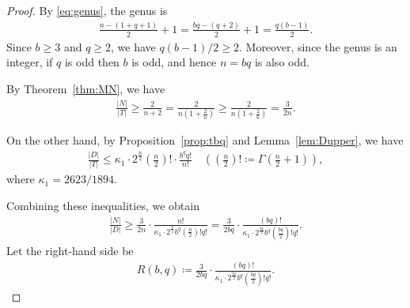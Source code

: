 \documentclass[12pt,reqno]{amsart}
\newcommand{\HL}{\vspace{2mm}}							%
\newcommand{\q}{\quad}									%
\newcommand{\f}[2]{\frac{#1}{#2}}							%
\newcommand{\ceq}{\coloneqq} 							%
\newcommand{\vt}[1]{\left\lvert #1 \right\rvert}					%
\theoremstyle{mythmstyle}
\theoremstyle{mydefstyle}
\newcommand{\thmref}[1]{Theorem~\ref{#1}}
\newcommand{\propref}[1]{Proposition~\ref{#1}}
\newcommand{\lemref}[1]{Lemma~\ref{#1}}
\numberwithin{equation}{section}
\begin{document}
\begin{proof}
By \eqref{eq:genus}, the genus is 
\begin{align}
\f{n-(1+q+1)}{2}+1 = \f{bq-(q+2)}{2}+1 = \f{q(b-1)}{2}.
\end{align}
Since $b \ge 3$ and $q \ge 2$, we have $q(b-1)/2 \ge 2$.
Moreover, since the genus is an integer, if $q$ is odd then $b$ is odd, and hence $n=bq$ is also odd.
\HL

By \thmref{thm:MN}, we have
\begin{align}
\label{eq:Nlower-e}
\f{\vt{N}}{\vt{T}} \ge \f{2}{n+2} = \f{2}{n(1+\f{2}{n})} \ge \f{2}{n(1+\f{2}{6})} = \f{3}{2n}.
\end{align}

On the other hand, by \propref{prop:tbq} and \lemref{lem:Dupper}, we have
\begin{align}
\f{\vt{D}}{\vt{T}} \le \kappa_{1}\cdot 2^{\f{n}{2}}\left(\f{n}{2}\right)!\cdot\f{b^{q}q!}{n!}\q
\left(\left(\f{n}{2}\right)! \ceq \Gamma\left(\f{n}{2}+1\right)\right),
\end{align}
where $\kappa_{1} = 2623/1894$.

Combining these inequalities, we obtain
\begin{align}
\f{\vt{N}}{\vt{D}} \ge \f{3}{2n}\cdot\f{n!}{\kappa_{1}\cdot 2^{\f{n}{2}}b^{q}\left(\f{n}{2}\right)!q!}
= \f{3}{2bq}\cdot\f{(bq)!}{\kappa_{1}\cdot 2^{\f{bq}{2}}b^{q}\left(\f{bq}{2}\right)!q!}.
\end{align}
Let the right-hand side be
\begin{align}
\label{eq:Rbq}
R(b, q) \ceq \f{3}{2bq}\cdot\f{(bq)!}{\kappa_{1}\cdot 2^{\f{bq}{2}}b^{q}\left(\f{bq}{2}\right)!q!}.
\end{align}


\end{proof}
\end{document}

